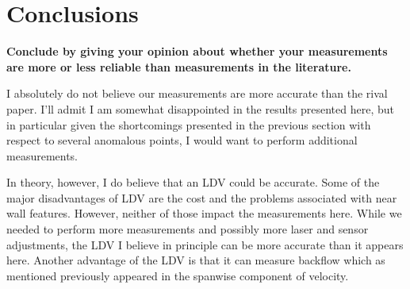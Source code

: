 \documentclass{article}
\begin{document}
\section{Conclusions}

\textbf{Conclude by giving your opinion about whether your measurements
are more or less reliable than measurements in the literature.} 

I absolutely do not believe our measurements are more accurate than the
rival paper. I'll admit I am somewhat disappointed in the results
presented here, but in particular given the shortcomings presented in
the previous section with respect to several anomalous points, I would
want to perform additional measurements. 

In theory, however, I do believe that an LDV could be accurate. Some of
the major disadvantages of LDV are the cost and the problems associated
with near wall features. However, neither of those impact the
measurements here. While we needed to perform more measurements and
possibly more laser and sensor adjustments, the LDV I believe in
principle can be more accurate than it appears here. Another
advantage of the LDV is that it can measure backflow which as mentioned
previously appeared in the spanwise component of velocity. 



%
%
%
\end{document}
